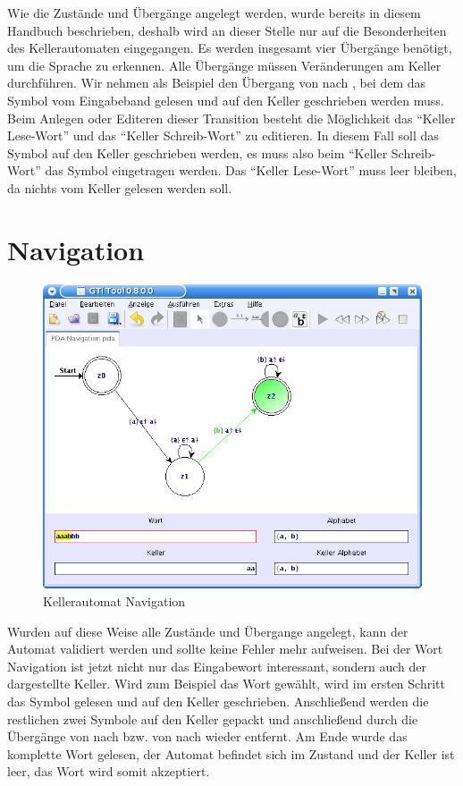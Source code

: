 Wie die Zustände und Übergänge angelegt werden, wurde bereits in diesem Handbuch
beschrieben, deshalb wird an dieser Stelle nur auf die Besonderheiten des
Kellerautomaten eingegangen. Es werden insgesamt vier Übergänge benötigt, um die
Sprache zu erkennen. Alle Übergänge müssen Veränderungen am Keller durchführen.
Wir nehmen als Beispiel den Übergang von  nach , bei dem das
Symbol  vom Eingabeband gelesen und auf den Keller geschrieben werden
muss. Beim Anlegen oder Editeren dieser Transition besteht die Möglichkeit das
"`Keller Lese-Wort"' und das "`Keller Schreib-Wort"' zu editieren. In diesem Fall
soll das Symbol  auf den Keller geschrieben werden, es muss also beim
"`Keller Schreib-Wort"' das Symbol  eingetragen werden. Das "`Keller
Lese-Wort"' muss leer bleiben, da nichts vom Keller gelesen werden
soll.\vspace{10pt}


\section{Navigation}

\begin{figure}[h]
\begin{center}
\includegraphics[width=12cm]{images/pda_navigation.png}
\caption{Kellerautomat Navigation}
\end{center}
\end{figure}

Wurden auf diese Weise alle Zustände und Übergange angelegt, kann der Automat
validiert werden und sollte keine Fehler mehr aufweisen. Bei der Wort
Navigation ist jetzt nicht nur das Eingabewort interessant, sondern auch der
dargestellte Keller. Wird zum Beispiel das Wort  gewählt, wird im
ersten Schritt das Symbol  gelesen und auf den Keller geschrieben.
Anschließend werden die restlichen zwei Symbole  auf den Keller
gepackt und anschließend durch die Übergänge von  nach 
bzw. von  nach  wieder entfernt. Am Ende wurde das
komplette Wort  gelesen, der Automat befindet sich im Zustand
 und der Keller ist leer, das Wort wird somit akzeptiert.


